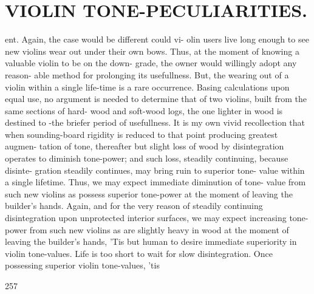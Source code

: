 \documentclass{article}
\begin{document}
\section*{VIOLIN TONE-PECULIARITIES.}
ent. Again, the case would be different could vi- olin users live long enough to see new violins wear out under their own bows. Thus, at the moment of knowing a valuable violin to be on the down- grade, the owner would willingly adopt any reason- able method for prolonging its usefullness. But, the wearing out of a violin within a single life-time is a rare occurrence. Basing calculations upon equal use, no argument is needed to determine that of two violins, built from the same sections of hard- wood and soft-wood logs, the one lighter in wood is destined to -the briefer period of usefullness. It is my own vivid recollection that when sounding-board rigidity is reduced to that point producing greatest augmen- tation of tone, thereafter but slight loss of wood by disintegration operates to diminish tone-power; and such loss, steadily continuing, because disinte- gration steadily continues, may bring ruin to superior tone- value within a single lifetime. Thus, we may expect immediate diminution of tone- value from such new violins as possess superior tone-power at the moment of leaving the builder's hands. Again, and for the very reason of steadily continuing disintegration upon unprotected interior surfaces, we may expect increasing tone-power from such new violins as are slightly heavy in wood at the moment of leaving the builder's hands, 'Tis but human to desire immediate superiority in violin tone-values. Life is too short to wait for slow disintegration. Once possessing superior violin tone-values, 'tis

257
\end{document}
